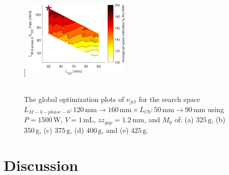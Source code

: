 \begin{figure}[!ht]
                ]{
                    \includegraphics[width=0.45\textwidth]{chap4/images3/400g.png}
                    \label{fig:chapter/rsm/LTFM/optimization/400}
                }
                \\
                \\
                \caption{
                    The global optimization plots of $v_{jet}$ for the search space $L_{M-3-phase-0}:120\,\mathrm{mm}\rightarrow 160\,\mathrm{mm} \times L_{C0}:50\,\mathrm{mm}\rightarrow 90\,\mathrm{mm}$ using $P=1500\,\mathrm{W}$, $V=1\,\mathrm{mL}$, $zz_{gap}=1.2\,\mathrm{mm}$,  and $M_0$ of: (a) $325\,\mathrm{g}$, (b) $350\,\mathrm{g}$, (c) $375\,\mathrm{g}$, (d) $400\,\mathrm{g}$, and (e) $425\,\mathrm{g}$.
                }   \label{fig:chapter/rsm/LTFM/optimization search space result for differnt mass}
            \end{figure}
            
            

            
    
    \section{Discussion}                            \label{Chapter:RSM/discussion}
    
